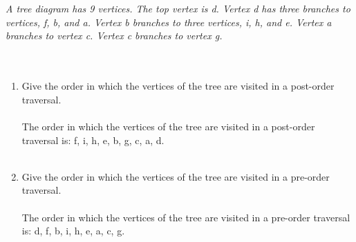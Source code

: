 \documentclass{amsart}
\theoremstyle{definition}
\theoremstyle{Exercise}
\theoremstyle{remark}
\theoremstyle{rule}
\numberwithin{equation}{section}
\begin{document}
\\\\
{\color{blue}{\bf Figure 14:} \emph{A tree diagram has 9 vertices. The top vertex is d. Vertex d has three branches to vertices, f, b, and a. Vertex b branches to three vertices, i, h, and e. Vertex a branches to vertex c. Vertex c branches to vertex g.
\\
}
}
\\
\\
\begin{enumerate}[label=(\alph*)]
\item Give the order in which the vertices of the tree are visited in a post-order traversal.\\\\
    The order in which the vertices of the tree are visited in a post-order traversal is: f, i, h, e, b, g, c, a, d.
\\\\
\item Give the order in which the vertices of the tree are visited in a pre-order traversal.\\\\
    The order in which the vertices of the tree are visited in a pre-order traversal is: d, f, b, i, h, e, a, c, g.
\\\\
\end{enumerate}


 \newpage
\end{document}
